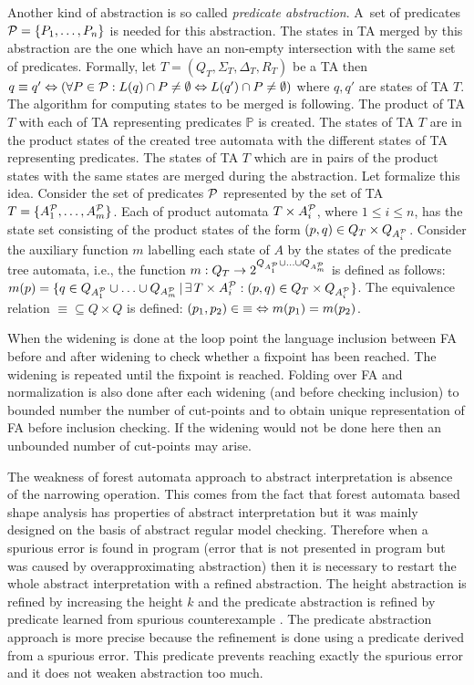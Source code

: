 \documentclass[a4paper, 12pt]{article}
\begin{document}
Another kind of abstraction is so called \emph{predicate abstraction}.
A~set of predicates $\predset=\{\pred_1, \ldots, \pred_n\}$ is needed for this abstraction.
The states in TA merged by this abstraction are the one which have an non-empty
intersection with the same set of predicates.
Formally, let $T=(Q_T, \Sigma_T, \Delta_T, R_T)$ be a TA then $q \equiv q' \defarrow
(\forall \pred \in \predset: \langstate{T}{q} \cap \pred \neq \emptyset
\Leftrightarrow \langstate{T}{q'} \cap \pred \neq \emptyset)$
where $q,q'$ are states of TA $T$.
The algorithm for computing states to be merged is following.
The product of TA $T$ with each of TA representing predicates $\mathbb{P}$ is created.
The states of TA $T$ are in the product states of the created tree automata with the different
states of TA representing predicates.
The states of TA $T$ which are in pairs of the product states with the same states are merged during
the abstraction.
Let formalize this idea.
Consider the set of predicates $\predset$ represented by the set of TA
$T=\{\predauti{1}, \ldots, \predauti{m}\}$.
Each of product automata $T \times \predauti{i}$, where $1 \leq i \leq n$, has the state set
consisting of the product states of the form $(p,q) \in Q_T \times Q_{\predauti{i}}$.
Consider the auxiliary function $m$ labelling
each state of $A$ by the states of the predicate tree automata,
i.e., the function $m: Q_T \rightarrow 2^{Q_{\predauti{1}} \cup \ldots
\cup Q_{\predauti{m}}}$ is defined as follows: $m(p) = \{q \in Q_{\predauti{1}} \cup \ldots \cup Q_{\predauti{m}}\,|\,
\exists\,T\times\predauti{i}: (p,q) \in Q_{T} \times Q_{\predauti{i}}\}$.
The equivalence relation ${\equiv} \subseteq {Q \times Q}$ is defined:
${(p_1,p_2)} \in {\equiv} \defarrow m(p_1) = m(p_2)$.

When the widening is done at the loop point the language inclusion between
FA before and after widening to check whether a fixpoint has been reached.
The widening is repeated until the fixpoint is reached.
Folding over FA and normalization is also done after each widening (and
before checking inclusion) to bounded number the number of cut-points
and to obtain unique representation of FA before inclusion checking.
If the widening would not be done here then an unbounded number of cut-points
may arise.

The weakness of forest automata approach to abstract interpretation is absence of
the narrowing operation.
This comes from the fact that forest automata based shape analysis has properties
of abstract interpretation but it was mainly designed on the basis of abstract
regular model checking.
Therefore when a spurious error is found in program (error that is not presented in
program but was caused by overapproximating abstraction) then it is necessary
to restart the whole abstract interpretation with a refined abstraction.
The height abstraction is refined by increasing the height $k$ and the predicate
abstraction is refined by predicate learned from spurious counterexample \cite{mt:hruska}.
The predicate abstraction approach is more precise because the refinement is done
using a predicate derived from a spurious error.
This predicate prevents reaching exactly the spurious error and
it does not weaken abstraction too much.
\end{document}
